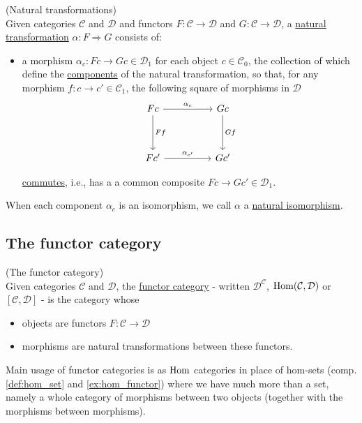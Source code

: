 \begin{definition}{(Natural transformations)}\label{def:natural_transformation}\\
\noindent Given categories $\mathcal{C}$ and $\mathcal{D}$ and functors $F : \mathcal{C} \rightarrow \mathcal{D}$ and
$G : \mathcal{C} \rightarrow \mathcal{D}$, a \ul{natural transformation} $\alpha : F \Rightarrow G$ consists of:
\begin{itemize}
\item a morphism $\alpha_{c} : Fc \rightarrow Gc \in \mathcal{D}_{1}$ for each object $c \in \mathcal{C}_{0}$, the collection of which
define the \ul{components} of the natural transformation, so that, for any morphism $f : c \rightarrow c' \in \mathcal{C}_{1}$, the following
square of morphisms in $\mathcal{D}$
\[\begin{tikzcd}
Fc \arrow[rr, "\alpha_{c}"] \arrow[dd, "Ff"] &  & Gc \arrow[dd, "Gf"] \\
                                             &  &                     \\
Fc' \arrow[rr, "\alpha_{c'}"]                &  & Gc'                
\end{tikzcd}\]

\ul{commutes}, i.e., has a a common composite $Fc \rightarrow Gc' \in \mathcal{D}_{1}$.
\end{itemize}
When each component $\alpha_{c}$ is an isomorphism, we call $\alpha$ a \ul{natural isomorphism}.
\end{definition}

\subsection{The functor category}

\begin{definition}{(The functor category)}\label{def:functor_category}\\
Given categories $\mathcal{C}$ and $\mathcal{D}$, the \ul{functor category} - written $\mathcal{D}^{\mathcal{C}}$, $\textup{Hom}(\mathcal{C},
\mathcal{D})$ or $[\mathcal{C}, \mathcal{D}]$ -
is the category whose
\begin{itemize}
\item objects are functors $F : \mathcal{C} \rightarrow \mathcal{D}$
\item morphisms are natural transformations between these functors.
\end{itemize}
Main usage of functor categories is as $\textup{Hom}$ categories in place of hom-sets (comp. \ref{def:hom_set} and \ref{ex:hom_functor}) where
we have much more than a set, namely a whole category of morphisms between two objects (together with the morphisms between morphisms).
\end{definition}
